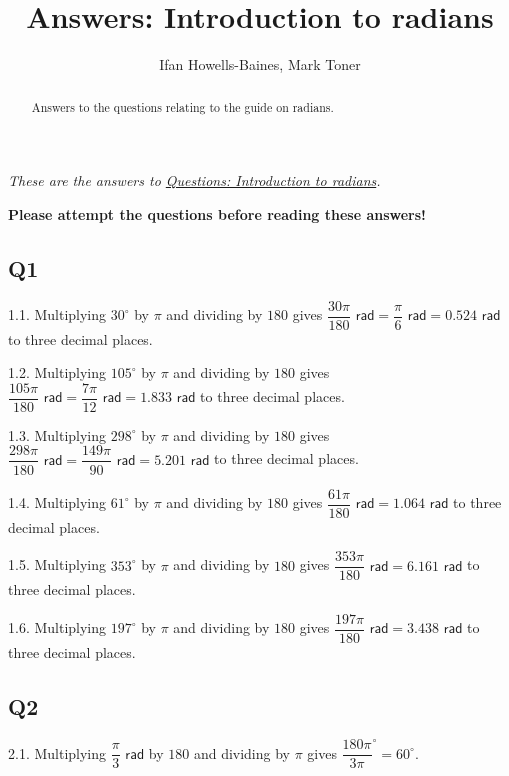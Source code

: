 \documentclass[
  12pt,
  a4paper, oneside]{starmastarticle}
\title{Answers: Introduction to radians}
\author{Ifan Howells-Baines, Mark Toner}
\date{}
\begin{document}
\maketitle
\begin{abstract}
Answers to the questions relating to the guide on radians.
\end{abstract}


\emph{These are the answers to
\href{../questions/qs-radians.qmd}{Questions: Introduction to radians}.}

\textbf{Please attempt the questions before reading these answers!}

\subsection*{Q1}\label{q1}

1.1. Multiplying \(30^\circ\) by \(\pi\) and dividing by \(180\) gives
\(\dfrac{30\pi}{180} \textsf{ rad} = \dfrac{\pi}{6} \textsf{ rad} = 0.524 \textsf{ rad}\)
to three decimal places.

1.2. Multiplying \(105^\circ\) by \(\pi\) and dividing by \(180\) gives
\(\dfrac{105\pi}{180} \textsf{ rad} = \dfrac{7\pi}{12} \textsf{ rad} = 1.833 \textsf{ rad}\)
to three decimal places.

1.3. Multiplying \(298^\circ\) by \(\pi\) and dividing by \(180\) gives
\(\dfrac{298\pi}{180} \textsf{ rad} = \dfrac{149\pi}{90} \textsf{ rad} = 5.201 \textsf{ rad}\)
to three decimal places.

1.4. Multiplying \(61^\circ\) by \(\pi\) and dividing by \(180\) gives
\(\dfrac{61\pi}{180} \textsf{ rad} = 1.064 \textsf{ rad}\) to three
decimal places.

1.5. Multiplying \(353^\circ\) by \(\pi\) and dividing by \(180\) gives
\(\dfrac{353\pi}{180} \textsf{ rad} = 6.161 \textsf{ rad}\) to three
decimal places.

1.6. Multiplying \(197^\circ\) by \(\pi\) and dividing by \(180\) gives
\(\dfrac{197\pi}{180} \textsf{ rad} = 3.438 \textsf{ rad}\) to three
decimal places.

\subsection*{Q2}\label{q2}

2.1. Multiplying \(\dfrac{\pi}{3} \textsf{ rad}\) by \(180\) and
dividing by \(\pi\) gives \(\dfrac{180\pi}{3\pi} ^\circ = 60 ^\circ\).
\end{document}
